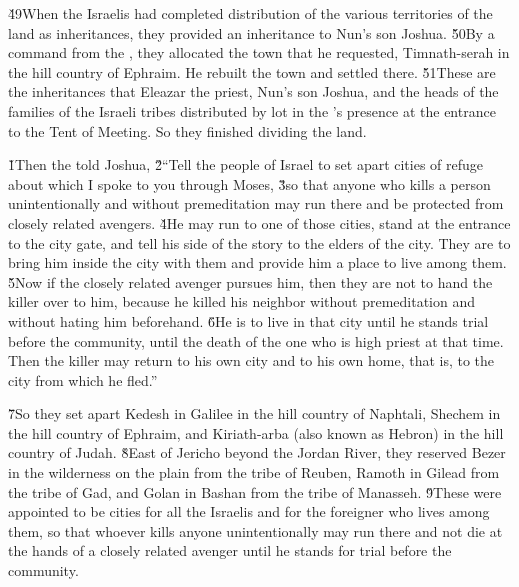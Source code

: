 \v{49}When the Israelis had completed distribution of the various territories of the land as inheritances, they provided an inheritance to Nun's son Joshua. \v{50}By a command from the , they allocated the town that he requested, Timnath-serah in the hill country of Ephraim. He rebuilt the town and settled there. \v{51}These are the inheritances that Eleazar the priest, Nun's son Joshua, and the heads of the families of the Israeli tribes distributed by lot in the 's presence at the entrance to the Tent of Meeting. So they finished dividing the land.

\v{1}Then the  told Joshua, \v{2}``Tell the people of Israel to set apart cities of refuge about which I spoke to you through Moses, \v{3}so that anyone who kills a person unintentionally and without premeditation may run there and be protected from closely related avengers. \v{4}He may run to one of those cities, stand at the entrance to the city gate, and tell his side of the story to the elders of the city. They are to bring him inside the city with them and provide him a place to live among them. \v{5}Now if the closely related avenger pursues him, then they are not to hand the killer over to him, because he killed his neighbor without premeditation and without hating him beforehand. \v{6}He is to live in that city until he stands trial before the community, until the death of the one who is high priest at that time. Then the killer may return to his own city and to his own home, that is, to the city from which he fled.''

\v{7}So they set apart Kedesh in Galilee in the hill country of Naphtali, Shechem in the hill country of Ephraim, and Kiriath-arba (also known as Hebron) in the hill country of Judah. \v{8}East of Jericho beyond the Jordan River, they reserved Bezer in the wilderness on the plain from the tribe of Reuben, Ramoth in Gilead from the tribe of Gad, and Golan in Bashan from the tribe of Manasseh. \v{9}These were appointed to be cities for all the Israelis and for the foreigner who lives among them, so that whoever kills anyone unintentionally may run there and not die at the hands of a closely related avenger until he stands for trial before the community.

